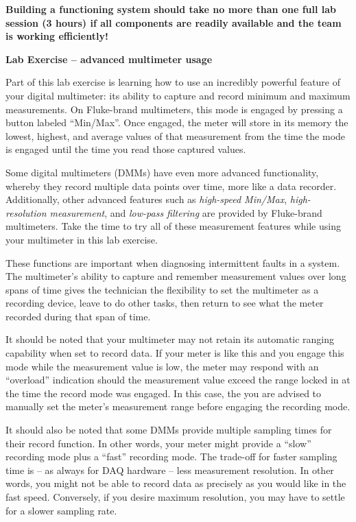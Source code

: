 \documentclass[12pt,a4paper]{article}
\begin{document}
\begin{itemize}
\vskip 10pt

{\bf Building a functioning system should take no more than one full lab session (3 hours) if all components are readily available and the team is working efficiently!}







\vfil \eject

\noindent
{\bf Lab Exercise -- advanced multimeter usage}

\vskip 5pt

Part of this lab exercise is learning how to use an incredibly powerful feature of your digital multimeter: its ability to capture and record minimum and maximum measurements.  On Fluke-brand multimeters, this mode is engaged by pressing a button labeled ``Min/Max''.  Once engaged, the meter will store in its memory the lowest, highest, and average values of that measurement from the time the mode is engaged until the time you read those captured values.

Some digital multimeters (DMMs) have even more advanced functionality, whereby they record multiple data points over time, more like a data recorder.  Additionally, other advanced features such as {\it high-speed Min/Max}, {\it high-resolution measurement}, and {\it low-pass filtering} are provided by Fluke-brand multimeters.  Take the time to try all of these measurement features while using your multimeter in this lab exercise.

\vskip 10pt

These functions are important when diagnosing intermittent faults in a system.  The multimeter's ability to capture and remember measurement values over long spans of time gives the technician the flexibility to set the multimeter as a recording device, leave to do other tasks, then return to see what the meter recorded during that span of time.

\vskip 10pt

It should be noted that your multimeter may not retain its automatic ranging capability when set to record data.  If your meter is like this and you engage this mode while the measurement value is low, the meter may respond with an ``overload'' indication should the measurement value exceed the range locked in at the time the record mode was engaged.  In this case, the you are advised to manually set the meter's measurement range before engaging the recording mode.

It should also be noted that some DMMs provide multiple sampling times for their record function.  In other words, your meter might provide a ``slow'' recording mode plus a ``fast'' recording mode.  The trade-off for faster sampling time is -- as always for DAQ hardware -- less measurement resolution.  In other words, you might not be able to record data as precisely as you would like in the fast speed.  Conversely, if you desire maximum resolution, you may have to settle for a slower sampling rate.


\end{itemize}
\end{document}
